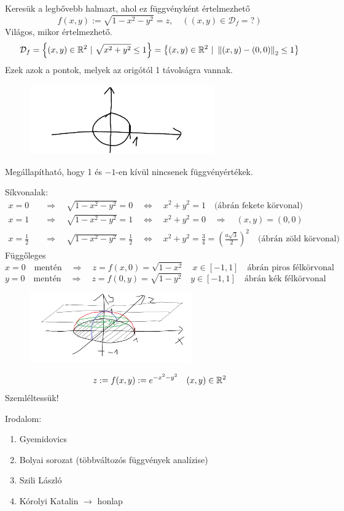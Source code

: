 \documentclass[a4paper,11.5pt]{article}
\newcommand{\norm}[1]{\left\lVert#1\right\rVert}
\begin{document}
	\begin{task}Keresük a legbővebb halmazt, ahol ez függvényként értelmezhető
		\[ f(x,y):=\sqrt{1-x^2-y^2}=z,\quad ((x,y)\in\mathcal{D}_f=?) \]
		Világos, mikor értelmezhető.
		\[ \mathcal{D}_f=\left\{(x,y)\in\R^2~|~\sqrt{x^2+y^2}\leq 1 \right\}=\left\{ (x,y)\in\R^2~|~\norm{(x,y)-(0,0)}_2\leq 1 \right\} \]
		Ezek azok a pontok, melyek az origótól 1 távolságra vannak.
		\begin{figure}[H]
			\centering
			\includegraphics[height=3cm]{../2zh/kepek/22.png}
			\caption{}
		\end{figure}
		Megállapítható, hogy 1 és $-1$-en kívül nincsenek függvényértékek.
		\smallskip
		
		Síkvonalak:
		\begin{align*}
			x=0&\quad \Rightarrow\quad \sqrt{1-x^2-y^2}=0\quad \Leftrightarrow\quad x^2+y^2=1 \quad \text{(ábrán fekete körvonal)}\\
			x=1&\quad \Rightarrow\quad \sqrt{1-x^2-y^2}=1\quad \Leftrightarrow\quad x^2+y^2=0\quad \Rightarrow\quad (x,y)=(0,0) \\
			x=\frac{1}{2}&\quad \Rightarrow\quad \sqrt{1-x^2-y^2}=\frac{1}{2}\quad \Leftrightarrow\quad x^2+y^2=\frac{3}{4}=\left(\frac{a\sqrt{3}}{2}\right)^2 \quad \text{(ábrán zöld körvonal)}
		\end{align*}
		Függőleges
		\[ x=0\quad \text{mentén}\quad \Rightarrow\quad z=f(x,0)=\sqrt{1-x^2}\quad x\in[-1,1]\quad \text{ábrán piros félkörvonal} \]
		\[ y=0\quad \text{mentén}\quad \Rightarrow\quad  z=f(0,y)=\sqrt{1-y^2}\quad y\in[-1,1]\quad \text{ábrán kék félkörvonal} \]
		\begin{figure}[H]
			\centering
			\includegraphics[height=3cm]{../2zh/kepek/23.png}
			\caption{}
		\end{figure}
	\end{task}
	\begin{exercise}
		\[ z:=f(x,y):=e^{-x^2-y^2}\quad (x,y)\in\mathbb{R}^2 \]
		Szemléltessük!
	\end{exercise}
	\begin{note}
		Irodalom:
		\begin{enumerate}
			\item Gyemidovics
			\item Bolyai sorozat (többváltozós függvények analízise)
			\item Szili László
			\item Kórolyi Katalin $\rightarrow$ honlap
		\end{enumerate}
	\end{note}
\end{document}
